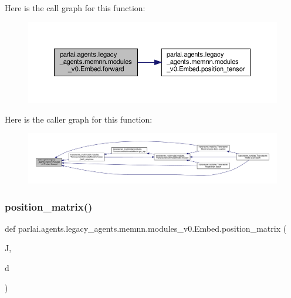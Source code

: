 Here is the call graph for this function\+:
\nopagebreak
\begin{figure}[H]
\begin{center}
\leavevmode
\includegraphics[width=350pt]{classparlai_1_1agents_1_1legacy__agents_1_1memnn_1_1modules__v0_1_1Embed_a4496856f88b3a68d1928ea500041c7c3_cgraph}
\end{center}
\end{figure}
Here is the caller graph for this function\+:
\nopagebreak
\begin{figure}[H]
\begin{center}
\leavevmode
\includegraphics[width=350pt]{classparlai_1_1agents_1_1legacy__agents_1_1memnn_1_1modules__v0_1_1Embed_a4496856f88b3a68d1928ea500041c7c3_icgraph}
\end{center}
\end{figure}
\mbox{\label{classparlai_1_1agents_1_1legacy__agents_1_1memnn_1_1modules__v0_1_1Embed_aac0da7cbc9d64949060c6c681172220f}} 
\subsubsection{\texorpdfstring{position\+\_\+matrix()}{position\_matrix()}}
{\footnotesize\ttfamily def parlai.\+agents.\+legacy\+\_\+agents.\+memnn.\+modules\+\_\+v0.\+Embed.\+position\+\_\+matrix (\begin{DoxyParamCaption}\item[{}]{J,  }\item[{}]{d }\end{DoxyParamCaption})}



